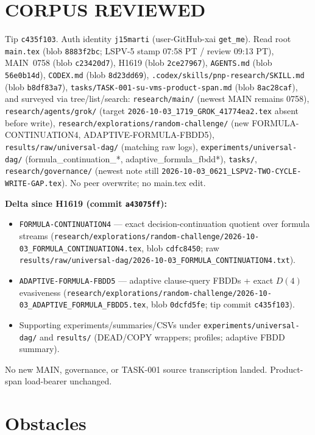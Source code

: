 \documentclass[11pt]{article}
\begin{document}
\section*{CORPUS REVIEWED}
Tip \texttt{c435f103}. Auth identity \texttt{j15marti}
(user-GitHub-xai \texttt{get\_me}).
Read root \texttt{main.tex} (blob \texttt{8883f2bc}; LSPV-5 stamp 07:58 PT / review 09:13 PT),
MAIN~0758 (blob \texttt{c23420d7}),
H1619 (blob \texttt{2ce27967}),
\texttt{AGENTS.md} (blob \texttt{56e0b14d}),
\texttt{CODEX.md} (blob \texttt{8d23dd69}),
\texttt{.codex/skills/pnp-research/SKILL.md} (blob \texttt{b8df83a7}),
\texttt{tasks/TASK-001-su-vms-product-span.md} (blob \texttt{8ac28caf}),
and surveyed via tree/list/search:
\texttt{research/main/} (newest MAIN remains 0758),
\texttt{research/agents/grok/} (target \texttt{2026-10-03\_1719\_GROK\_41774ea2.tex} absent before write),
\texttt{research/explorations/random-challenge/} (new FORMULA-CONTINUATION4, ADAPTIVE-FORMULA-FBDD5),
\texttt{results/raw/universal-dag/} (matching raw logs),
\texttt{experiments/universal-dag/} (formula\_continuation\_*, adaptive\_formula\_fbdd*),
\texttt{tasks/},
\texttt{research/governance/} (newest note still
\texttt{2026-10-03\_0621\_LSPV2-TWO-CYCLE-WRITE-GAP.tex}).
No peer overwrite; no main.tex edit.

\textbf{Delta since H1619 (commit \texttt{a43075ff}):}
\begin{itemize}
\item \texttt{FORMULA-CONTINUATION4} --- exact decision-continuation quotient over formula streams
  (\texttt{research/explorations/random-challenge/2026-10-03\_FORMULA\_CONTINUATION4.tex},
  blob \texttt{cdfc8450}; raw \texttt{results/raw/universal-dag/2026-10-03\_FORMULA\_CONTINUATION4.txt}).
\item \texttt{ADAPTIVE-FORMULA-FBDD5} --- adaptive clause-query FBDDs + exact $D(4)$ evasiveness
  (\texttt{research/explorations/random-challenge/2026-10-03\_ADAPTIVE\_FORMULA\_FBDD5.tex},
  blob \texttt{0dcfd5fe}; tip commit \texttt{c435f103}).
\item Supporting experiments/summaries/CSVs under \texttt{experiments/universal-dag/} and
  \texttt{results/} (DEAD/COPY wrappers; profiles; adaptive FBDD summary).
\end{itemize}
No new MAIN, governance, or TASK-001 source transcription landed. Product-span load-bearer unchanged.

\section*{Obstacles}
\end{document}
